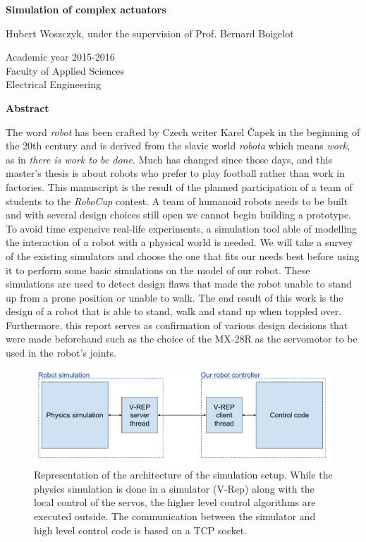 \thispagestyle{empty}
\begin{center}
    \Large
    \textbf{Simulation of complex actuators}
    
    \vspace{0.4cm}
    \large
    Hubert Woszczyk, under the supervision of Prof. Bernard Boigelot
    
    \normalsize
    Academic year 2015-2016\\
    Faculty of Applied Sciences\\
    Electrical Engineering
    
    \vspace{0.9cm}
    \textbf{Abstract}
\end{center}
The word \emph{robot} has been crafted by Czech writer Karel Čapek in the beginning of the 20th century and is derived from the slavic world \emph{robota} which means \emph{work}, as in \emph{there is work to be done}. Much has changed since those days, and this master's thesis is about robots who prefer to play football rather than work in factories. This manuscript is the result of the planned participation of a team of students to the \emph{RoboCup} contest. A team of humanoid robots needs to be built and with several design choices still open we cannot begin building a prototype. To avoid time expensive real-life experiments, a simulation tool able of modelling the interaction of a robot with a physical world is needed. We will take a survey of the existing simulators and choose the one that fits our needs best before using it to perform some basic simulations on the model of our robot. These simulations are used to detect design flaws that made the robot unable to stand up from a prone position or unable to walk. The end result of this work is the design of a robot that is able to stand, walk and stand up when toppled over. Furthermore, this report serves as confirmation of various design decisions that were made beforehand such as the choice of the MX-28R as the servomotor to be used in the robot's joints.
\clearpage

\thispagestyle{empty}
\vspace*{3cm}
\begin{figure}[htp]
\center
    \includegraphics[width = \textwidth]{figures/simulation_principles}
    \caption[]{Representation of the architecture of the simulation setup. While the physics simulation is done in a simulator (V-Rep) along with the local control of the servos, the higher level control algorithms are executed outside. The communication between the simulator and high level control code is based on a TCP socket.}
    \label{fig:abstract1}
\end{figure}

